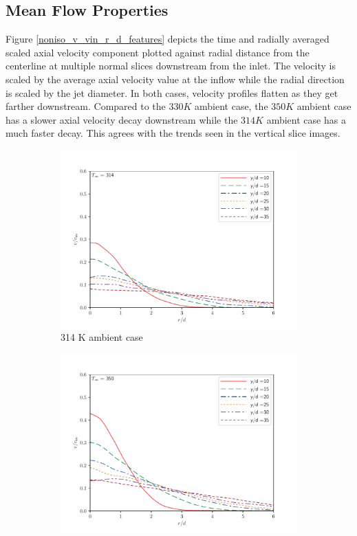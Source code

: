 \subsection{Mean Flow Properties}
Figure \ref{noniso_v_vin_r_d_features} depicts the time and radially averaged scaled axial velocity component plotted against radial distance from the centerline at multiple normal slices downstream from the inlet. The velocity is scaled by the average axial velocity value at the inflow while the radial direction is scaled by the jet diameter. In both cases, velocity profiles flatten as they get farther downstream. Compared to the $330 K$ ambient case, the $350 K$ ambient case has a slower axial velocity decay downstream while the $314 K$ ambient case has a much faster decay. This agrees with the trends seen in the vertical slice images. 
\begin{figure}[H]
\begin{center}
\begin{subfigure}{0.45\textwidth}
	\includegraphics[scale=.45]{figures/Plots/radial/slices_5/314_ambient/ur_u_in_vs_r_d.pdf}
	\caption{314 K ambient case} \label{noniso_v_vin_r_d_1}
\end{subfigure}
\begin{subfigure}{0.45\textwidth}
	\includegraphics[scale=.45]{figures/Plots/radial/slices_5/350_ambient/ur_u_in_vs_r_d.pdf}

\end{subfigure}
\end{center}
\end{figure}
